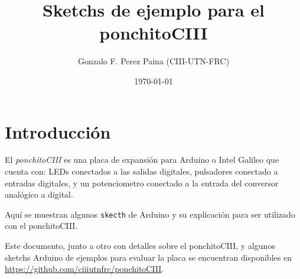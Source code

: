 \documentclass[a4paper]{article}
\title{Sketchs de ejemplo para el ponchitoCIII}
\author{Gonzalo F. Perez Paina (CIII-UTN-FRC)}
\date{\today}
\begin{document}
\maketitle

\section{Introducción}
El \textit{ponchitoCIII} es una placa de expansión para Arduino o Intel Galileo que cuenta con: LEDs conectados a las salidas digitales, pulsadores conectado a entradas digitales, y un potenciometro conectado a la entrada del conversor analógico a digital.

Aquí se muestran algunos \texttt{skecth} de Arduino y su explicación para ser utilizado con el ponchitoCIII.

Este documento, junto a otro con detalles sobre el ponchitoCIII, y algunos sketchs Arduino de ejemplos para evaluar la placa se encuentran disponibles en \href{https://github.com/ciiiutnfrc/ponchitoCIII}{https://github.com/ciiiutnfrc/ponchitoCIII}.
\end{document}
